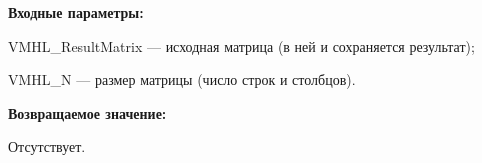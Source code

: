 \textbf{Входные параметры:}  
 
VMHL\_ResultMatrix --- исходная матрица (в ней и сохраняется результат);
 
VMHL\_N --- размер матрицы (число строк и столбцов).

\textbf{Возвращаемое значение:}

Отсутствует.